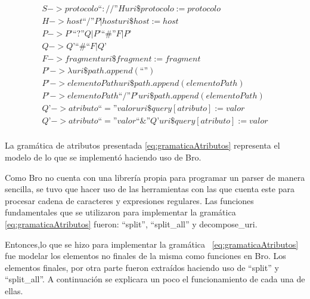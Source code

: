 \begin{equation}\label{eq:gramaticaAtributos}
\begin{aligned}
S -> protocolo “ :// ” H { uri\$protocolo := protocolo } \\
H -> host “/” P | host { uri\$host := host  } \\
P -> P’ “?” Q | P’ “\#” F | P’ \\
Q -> Q’ “\#“ F | Q’ \\
F -> fragment { uri\$fragment := fragment } \\
P’ -> \lambda  { uri\$path.append(“”) } \\
P’ ->  elementoPath { uri\$path.append(elementoPath) } \\
P’ -> elementoPath “/” P’ { uri\$path.append(elementoPath) } \\
Q’ -> atributo “=” valor { uri\$query[atributo] := valor } \\
Q’ -> atributo “=” valor “\&” Q’ { uri\$query[atributo] := valor } \\
\end{aligned}
\end{equation}

    La gramática de atributos presentada \ref{eq:gramaticaAtributos} representa el modelo de lo que se implementó haciendo uso de Bro.

    Como Bro no cuenta con una librería propia para programar un parser de manera sencilla, se tuvo que hacer uso de las herramientas con las que cuenta este para procesar cadena de caracteres y expresiones regulares. Las funciones fundamentales que se utilizaron para implementar  la gramática \ref{eq:gramaticaAtributos} fueron: “split”, “split\_all” y decompose\_uri.

Entonces,lo que se hizo para implementar la gramática ~\ref{eq:gramaticaAtributos} fue modelar los elementos no finales de la misma como funciones en Bro. Los elementos finales, por otra parte fueron extraídos haciendo uso de “split” y “split\_all”. A continuación se explicara un poco el funcionamiento de cada una de ellas.

